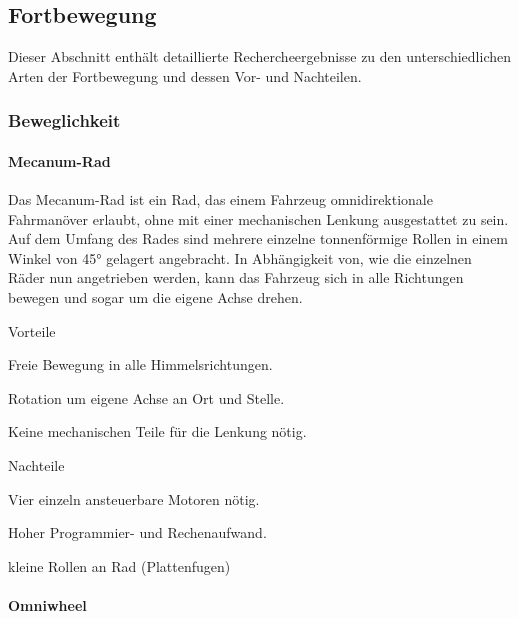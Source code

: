 \documentclass[../main.tex]{subfiles}
\begin{document}
\newpage
\subsection{Fortbewegung}

Dieser Abschnitt enthält detaillierte Rechercheergebnisse zu den unterschiedlichen Arten der Fortbewegung und dessen Vor- und Nachteilen.

\subsubsection{Beweglichkeit}

\paragraph{Mecanum-Rad} \label{recherche-mecanum-rad}

Das Mecanum-Rad ist ein Rad, das einem Fahrzeug omnidirektionale Fahrmanöver erlaubt, ohne mit einer mechanischen Lenkung ausgestattet zu sein.
Auf dem Umfang des Rades sind mehrere einzelne tonnenförmige Rollen in einem Winkel von 45° gelagert angebracht. 
In Abhängigkeit von, wie die einzelnen Räder nun angetrieben werden, kann das Fahrzeug sich in alle Richtungen bewegen und sogar um die eigene Achse drehen.

\begin{minipage}[t]{0.48\textwidth}
    \begin{items}
      \item [Vorteile]
      \item Freie Bewegung in alle Himmelsrichtungen.
      \item Rotation um eigene Achse an Ort und Stelle.
      \item Keine mechanischen Teile für die Lenkung nötig.
 \end{items}
\end{minipage}
\hfill
\begin{minipage}[t]{0.48\textwidth}
    \begin{items}
      \item [Nachteile]
      \item Vier einzeln ansteuerbare Motoren nötig.
      \item Hoher Programmier- und Rechenaufwand.
      \item kleine Rollen an Rad (Plattenfugen)
    \end{items}
\end{minipage}

\paragraph{Omniwheel} \label{recherche-omniwheel}
\end{document}
